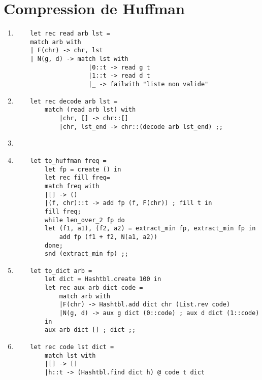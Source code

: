 \documentclass{article}
\newcommand{\image}[3]{ %
    \begin{minipage}[t]{\linewidth}
        #1
              \adjustbox{valign=t}{%
                \texttt{[image: \#3]}%
              }
    \end{minipage}}
\begin{document}
\section{Compression de Huffman}

\begin{enumerate}
    
\item \begin{verbatim}
    let rec read arb lst =
    match arb with
    | F(chr) -> chr, lst
    | N(g, d) -> match lst with
                    |0::t -> read g t
                    |1::t -> read d t
                    |_ -> failwith "liste non valide"
\end{verbatim}

\item \begin{verbatim}
    let rec decode arb lst =
        match (read arb lst) with
            |chr, [] -> chr::[]
            |chr, lst_end -> chr::(decode arb lst_end) ;;
\end{verbatim}

\item \image{\raggedright}{0.45}{drawing/II_3.pdf}

\item \begin{verbatim}
    let to_huffman freq =
        let fp = create () in
        let rec fill freq=
        match freq with
        |[] -> ()
        |(f, chr)::t -> add fp (f, F(chr)) ; fill t in
        fill freq;
        while len_over_2 fp do
        let (f1, a1), (f2, a2) = extract_min fp, extract_min fp in
            add fp (f1 + f2, N(a1, a2))
        done;
        snd (extract_min fp) ;;
\end{verbatim}

\item \begin{verbatim}
    let to_dict arb = 
        let dict = Hashtbl.create 100 in
        let rec aux arb dict code =
            match arb with
            |F(chr) -> Hashtbl.add dict chr (List.rev code)
            |N(g, d) -> aux g dict (0::code) ; aux d dict (1::code) 
        in
        aux arb dict [] ; dict ;;
\end{verbatim}

\item \begin{verbatim}
    let rec code lst dict =
        match lst with
        |[] -> []
        |h::t -> (Hashtbl.find dict h) @ code t dict
\end{verbatim}
\end{enumerate}
\end{document}
